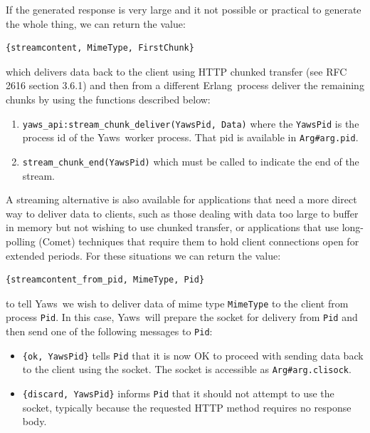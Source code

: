 \documentclass[11pt,oneside,english]{book}
\newcommand{\Erlang}            %
        {{\sc Erlang}}
\newcommand{\Yaws}            %
        {{\sc Yaws}}
\begin{document}
If the generated response is very large and it not possible or
practical to generate the whole thing, we can return the value:

\begin{verbatim}
{streamcontent, MimeType, FirstChunk}
\end{verbatim}

\noindent which delivers data back to the client using HTTP chunked
transfer (see RFC 2616 section 3.6.1) and then from a different
\Erlang\ process deliver the remaining chunks by using the functions
described below:

\begin{enumerate}
\item \verb+yaws_api:stream_chunk_deliver(YawsPid, Data)+ where the
  \verb+YawsPid+ is the process id of the \Yaws\ worker process. That
  pid is available in \verb+Arg#arg.pid+.

\item \verb+stream_chunk_end(YawsPid)+ which must be called to
  indicate the end of the stream.
\end{enumerate}

A streaming alternative is also available for applications that need a
more direct way to deliver data to clients, such as those dealing with
data too large to buffer in memory but not wishing to use chunked
transfer, or applications that use long-polling (Comet) techniques
that require them to hold client connections open for extended
periods. For these situations we can return the value:

\begin{verbatim}
{streamcontent_from_pid, MimeType, Pid}
\end{verbatim}

\noindent to tell \Yaws\ we wish to deliver data of mime type
\verb+MimeType+ to the client from process \verb+Pid+. In this case,
\Yaws\ will prepare the socket for delivery from \verb+Pid+ and then
send one of the following messages to \verb+Pid+:
\begin{itemize}
\item \verb+{ok, YawsPid}+ tells \verb+Pid+ that it is now OK to
  proceed with sending data back to the client using the socket. The
  socket is accessible as \verb+Arg#arg.clisock+.

\item \verb+{discard, YawsPid}+ informs \verb+Pid+ that it should not
  attempt to use the socket, typically because the requested HTTP
  method requires no response body.
\end{itemize}
\end{document}

